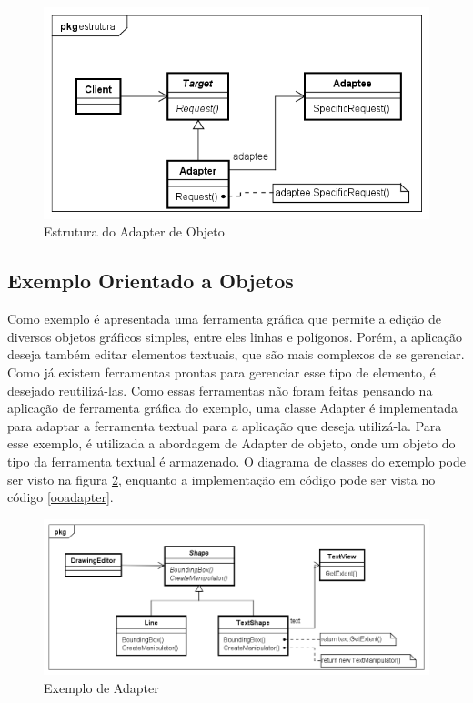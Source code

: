 \begin{figure}[htb]
	\caption{\label{adapter_alt_struct}Estrutura do Adapter de Objeto}
	\begin{center}
	    \includegraphics[scale=0.5]{5_padroes-contexto-funcional/5.2_estruturais/5.2.1_adapter/adapter_objeto_estrutura.png}
	\end{center}
\end{figure}

\subsection*{Exemplo Orientado a Objetos}

Como exemplo é apresentada uma ferramenta gráfica 
que permite a edição de diversos objetos gráficos 
simples, entre eles linhas e polígonos. Porém, 
a aplicação deseja também editar elementos textuais, 
que são mais complexos de se gerenciar. Como já existem 
ferramentas prontas para gerenciar esse tipo de 
elemento, é desejado reutilizá-las. Como essas 
ferramentas não foram feitas pensando na 
aplicação de ferramenta gráfica do exemplo, uma 
classe Adapter é implementada para adaptar a 
ferramenta textual para a aplicação que deseja 
utilizá-la. Para esse exemplo, é utilizada a 
abordagem de Adapter de objeto, onde um objeto 
do tipo da ferramenta textual é armazenado. O 
diagrama de classes do exemplo pode ser visto na 
figura \ref{adapter_exemplo}, enquanto a 
implementação em código pode ser vista no código 
\ref{ooadapter}.


\begin{figure}[htb]
	\caption{\label{adapter_exemplo}Exemplo de Adapter}
	\begin{center}
	    \includegraphics[scale=0.5]{5_padroes-contexto-funcional/5.2_estruturais/5.2.1_adapter/adapter_exemplo.png}
	\end{center}
\end{figure}


